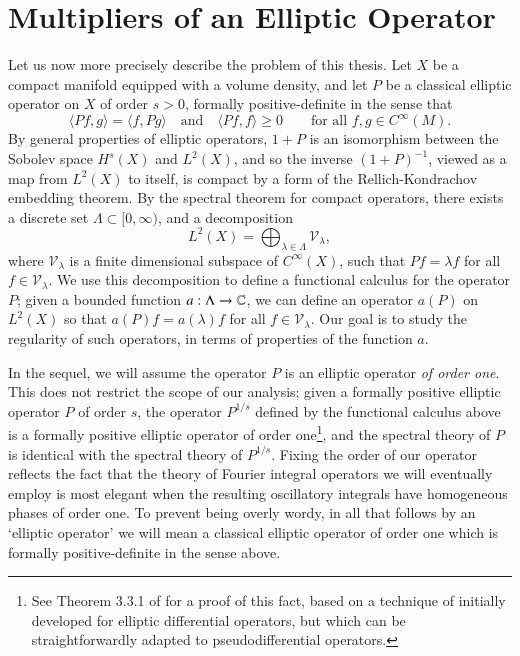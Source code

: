
\chapter{Multipliers of an Elliptic Operator} \label{cha:multipliers_of_an_elliptic_operator}

Let us now more precisely describe the problem of this thesis. Let $X$ be a compact manifold equipped with a volume density, and let $P$ be a classical elliptic operator on $X$ of order $s > 0$, formally positive-definite in the sense that
%
\[ \langle Pf, g \rangle = \langle f, Pg \rangle \quad\text{and}\quad \langle Pf, f \rangle \geq 0 \quad\quad\text{for all $f,g \in C^\infty(M)$}. \]
%
By general properties of elliptic operators, $1 + P$ is an isomorphism between the Sobolev space $H^s(X)$ and $L^2(X)$,
%
%
and so the inverse $(1 + P)^{-1}$, viewed as a map from $L^2(X)$ to itself, is compact by a form of the Rellich-Kondrachov embedding theorem. By the spectral theorem for compact operators, there exists a discrete set $\Lambda \subset [0,\infty)$, and a decomposition
%
\[ L^2(X) = \bigoplus\nolimits_{\lambda \in \Lambda} \mathcal{V}_\lambda, \]
%
where $\mathcal{V}_\lambda$ is a finite dimensional subspace of $C^\infty(X)$, such that $Pf = \lambda f$ for all $f \in \mathcal{V}_\lambda$. We use this decomposition to define a functional calculus for the operator $P$; given a bounded function $a: \Lambda \to \operatorname{\mathbb{C}}$, we can define an operator $a(P)$ on $L^2(X)$ so that $a(P) f = a(\lambda) f$ for all $f \in \mathcal{V}_\lambda$. Our goal is to study the regularity of such operators, in terms of properties of the function $a$.

In the sequel, we will assume the operator $P$ is an elliptic operator \emph{of order one}. This does not restrict the scope of our analysis; given a formally positive elliptic operator $P$ of order $s$, the operator $P^{1/s}$ defined by the functional calculus above is a formally positive elliptic operator of order one\footnote{See Theorem 3.3.1 of \cite{Sogge} for a proof of this fact, based on a technique of \cite{Seeley} initially developed for elliptic differential operators, but which can be straightforwardly adapted to pseudodifferential operators.}, and the spectral theory of $P$ is identical with the spectral theory of $P^{1/s}$. Fixing the order of our operator reflects the fact that the theory of Fourier integral operators we will eventually employ is most elegant when the resulting oscillatory integrals have homogeneous phases of order one. To prevent being overly wordy, in all that follows by an `elliptic operator' we will mean a classical elliptic operator of order one which is formally positive-definite in the sense above.

